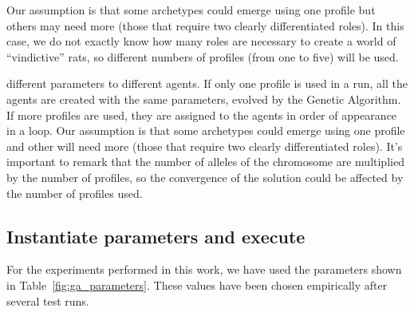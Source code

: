 \documentclass{sig-alternate}
\begin{document}
Our assumption is that
some archetypes could emerge using one profile but others may need
more (those that require two clearly differentiated roles). In this case,
 we do not exactly know how many roles are necessary to create a world of ``vindictive''
  rats, so different numbers of profiles (from one to five) will be used.


different parameters to different agents. 
If only one profile is used
in a run, all the agents are created with the same parameters, evolved
by the Genetic Algorithm. If more profiles are used, they are assigned
to the agents in order of appearance in a loop. Our assumption is that
some archetypes could emerge using one profile and other will need
more (those that require two clearly differentiated roles). It's
important to remark that the number of alleles of the chromosome are
multiplied by the number of profiles, so the convergence of the
solution could be affected by the number of profiles used. 




\subsection{Instantiate parameters and execute}

For the experiments performed in this work, we have used the parameters shown in Table~\ref{fig:ga_parameters}. These values have been chosen empirically after several test runs.
\end{document}

